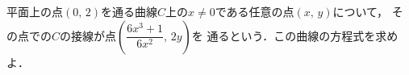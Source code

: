 \documentclass[../../main.tex]{subfiles}
\begin{document}
平面上の点$(0, \, 2)$を通る曲線$C$上の$x\neq0$である任意の点$(x, \, y)$について，
その点での$C$の接線が点$\displaystyle\left( \dfrac{6x^3+1}{6x^2}, \, 2y \right)$を
通るという．この曲線の方程式を求めよ．
\end{document}
